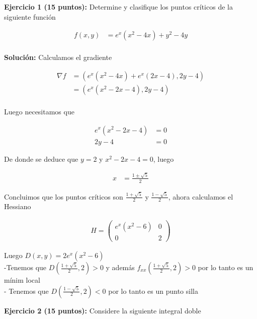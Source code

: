 \documentclass[a4paper]{article}
\begin{document}
\setlength{\parindent}{0cm}

\textbf{Ejercicio 1 (15 puntos):} Determine y clasifique los puntos críticos de la siguiente función

\begin{align*}
    f(x,y) &= e^x(x^2-4x)+y^2-4y \\
\end{align*}



\textbf{Solución:} Calculamos el gradiente

\begin{align*}
    \nabla f &=(e^x(x^2-4x)+e^x(2x-4), 2y-4) \\
    &=(e^x(x^2-2x-4), 2y-4) \\
\end{align*}

Luego necesitamos que

\begin{align*}
    e^x(x^2-2x-4) &= 0 \\
    2y-4 &= 0
\end{align*}

De donde se deduce que  $y=2$ y $x^2-2x-4=0$, luego 

\begin{align*}
    x &= \frac{1 \pm \sqrt{5}}{2}
\end{align*}

Concluimos que los puntos críticos son $\displaystyle \frac{1 + \sqrt{5}}{2}$ y $\displaystyle \frac{1 - \sqrt{5}}{2}$, ahora calculamos el Hessiano

\begin{align}
    H = \begin{pmatrix}
        e^x(x^2-6) & 0 \\
        0 & 2
    \end{pmatrix}
\end{align}

Luego $D(x,y)= 2e^x(x^2-6)$ \\

-Tenemos que $D( \frac{1 + \sqrt{5}}{2},2) > 0$ y además $f_{xx}(\frac{1 + \sqrt{5}}{2},2) > 0$ por lo tanto es un mínim local\\

- Tenemos que $D( \frac{1 - \sqrt{5}}{2},2) < 0$ por lo tanto es un punto silla \\






\newpage

\textbf{Ejercicio 2 (15 puntos):} Considere la siguiente integral doble
\end{document}
